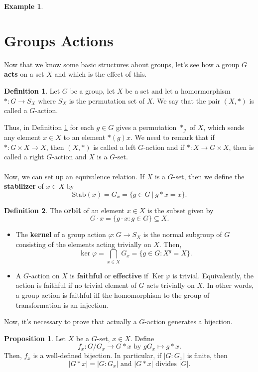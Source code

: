 \documentclass[11pt]{amsbook}%
\newcommand{\ii}{\item}
\theoremstyle{plain}
\theoremstyle{definition}
\newtheorem{definition*}{Definition}
\newtheorem*{example*}{Example}
\newtheorem{proposition}[theorem]{Proposition}
\numberwithin{equation}{section}
\newcommand{\Stab}[1]{\text{Stab}(#1)}
\DeclareMathOperator{\Ker}{Ker}
\begin{document}
\begin{example*}
\section{Groups Actions}
Now that we know some basic structures about groups, let's see how a group $G$ \textbf{acts} on a set $X$
and which is the effect of this.
\begin{definition*}
  \label{def-19}
  Let $G$ be a group, let $X$ be a set and let a homormorphism $*: G \longrightarrow S_{X}$ where
  $S_{X}$ is the permutation set of $X$. We say that the pair $(X, *)$ is called a $G$-action.
\end{definition*} 
Thus, in Definition \ref{def-19} for each $g \in G$ gives a permutation $*_{g}$ of $X$, which
sends any element $x \in X$ to an element $*(g)x$. We need to remark that if
$*: G \times X \longrightarrow X$, then $(X, *)$ is called a left $G$-action and
if $*: X \longrightarrow  G \times X$, then is called a right $G$-action and
$X$ is a $G$-set. \\ \\
Now, we can set up an equivalence relation. If $X$ is a $G$-set, then we define
the \textbf{stabilizer} of $x \in X$ by
$$
\Stab{x} = G_{x} = \{g \in G \ | \ g * x = x\}.
$$
\begin{definition*}
  \label{def-orbit}
  The \textbf{orbit} of an element $x \in X$ is the subset given by
  $$
  G \cdot x = \{g \cdot x : g \in G \} \subseteq X.
  $$
\end{definition*}
\begin{itemize}
  \ii The \textbf{kernel} of a group action $\varphi: G \longrightarrow S_{X}$ is the normal subgroup of $G$
  consisting of the elements acting trivially on $X$. Then,
  $$
  \ker \varphi = \bigcap_{x \in X} G_{x} = \{g \in G : X^{g} = X\}.
  $$
  \ii A $G$-action on $X$ is \textbf{faithful} or \textbf{effective} if $\Ker \varphi$ is trivial.
  Equivalently, the action is faithful if no trivial element of $G$
  acts trivially on $X$. In other words, a group action is faithful iff
  the homomorphism to the group of transformation is an injection.
\end{itemize}
Now, it's necessary to prove that actually a $G$-action generates a bijection.
\begin{proposition}
  Let $X$ be a $G$-set, $x \in X$. Define
  $$
  f_{x}: G/G_{x} \longrightarrow G*x  \text{ by } gG_{x} \mapsto g*x.
  $$
  Then, $f_{x}$ is a well-defined bijection. In particular, if $|G:G_{x}|$ is finite,
  then
  $$
  |G*x| = |G:G_{x}| \text{ and } |G*x| \text{ divides } |G|.
$$
\end{proposition}
\end{example*}
\end{document}
